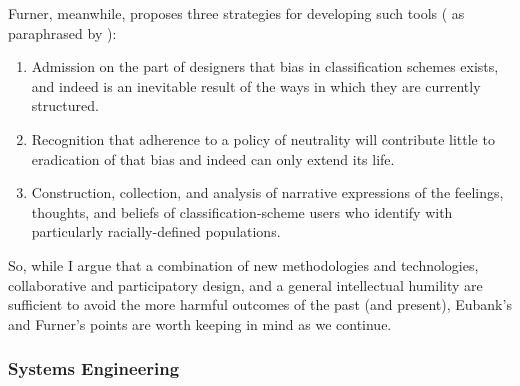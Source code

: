 Furner, meanwhile, proposes three strategies for developing such tools (\cite{furner2007dewey} as paraphrased by \cite{nobleAlgorithmsOppressionHow2018}):

\begin{enumerate} \setlength{\itemsep}{0pt} \setlength{\parskip}{0pt} 
	\item{Admission on the part of designers that bias in classification schemes exists, and indeed is an inevitable result of the ways in which they are currently structured.}
	\item{Recognition that adherence to a policy of neutrality will contribute little to eradication of that bias and indeed can only extend its life.}
	\item{Construction, collection, and analysis of narrative expressions of the feelings, thoughts, and beliefs of classification-scheme users who identify with particularly racially-defined populations.}
\end{enumerate}

So, while I argue that a combination of new methodologies and technologies, collaborative and participatory design, and a general intellectual humility are sufficient to avoid the more harmful outcomes of the past (and present), Eubank's and Furner's points are worth keeping in mind as we continue.




%

\subsubsection{Systems Engineering} \label{sec:se_critique}

